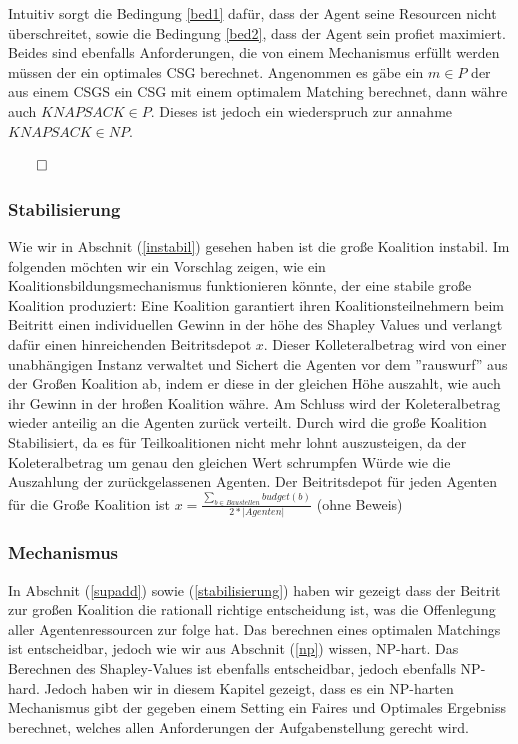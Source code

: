 Intuitiv sorgt die Bedingung \ref{bed1} dafür, dass der Agent seine Resourcen nicht überschreitet, sowie die Bedingung \ref{bed2}, dass der Agent sein profiet maximiert. Beides sind ebenfalls Anforderungen, die von einem Mechanismus erfüllt werden müssen der ein optimales CSG berechnet.
Angenommen es gäbe ein $m\in P$ der aus einem CSGS ein CSG mit einem optimalem Matching berechnet, dann währe auch $KNAPSACK\in P$. Dieses ist jedoch ein wiederspruch zur annahme $KNAPSACK\in NP$.
\begin{flushright}
  $\qed$
\end{flushright}

\subsubsection*{Stabilisierung}
\label{stabilisierung}
Wie wir in Abschnit (\ref{instabil}) gesehen haben ist die große Koalition instabil. Im folgenden möchten wir ein Vorschlag zeigen, wie ein Koalitionsbildungsmechanismus funktionieren könnte, der eine stabile große Koalition produziert:
Eine Koalition garantiert ihren Koalitionsteilnehmern beim Beitritt einen individuellen Gewinn in der höhe des Shapley Values und verlangt dafür einen hinreichenden Beitritsdepot $x$. Dieser Kolleteralbetrag wird von einer unabhängigen Instanz verwaltet und Sichert die Agenten vor dem ''rauswurf'' aus der Großen Koalition ab, indem er diese in der gleichen Höhe auszahlt, wie auch ihr Gewinn in der hroßen Koalition währe. Am Schluss wird der Koleteralbetrag wieder anteilig an die Agenten zurück verteilt. Durch wird die große Koalition Stabilisiert, da es für Teilkoalitionen nicht mehr lohnt auszusteigen, da der Koleteralbetrag um genau den gleichen Wert schrumpfen Würde wie die Auszahlung der zurückgelassenen Agenten. Der Beitritsdepot für jeden Agenten für die Große Koalition ist $x=\frac{\sum_{b\in Baustellen} budget(b)}{2*|Agenten|}$ (ohne Beweis)

\subsubsection{Mechanismus}
\label{thmechanism}
In Abschnit (\ref{supadd}) sowie (\ref{stabilisierung}) haben wir gezeigt dass der Beitrit zur großen Koalition die rationall richtige entscheidung ist, was die Offenlegung aller Agentenressourcen zur folge hat.
Das berechnen eines optimalen Matchings ist entscheidbar, jedoch wie wir aus Abschnit (\ref{np}) wissen, NP-hart.
Das Berechnen des Shapley-Values ist ebenfalls entscheidbar, jedoch ebenfalls NP-hard.
Jedoch haben wir in diesem Kapitel gezeigt, dass es ein NP-harten Mechanismus gibt der gegeben einem Setting ein Faires und Optimales Ergebniss berechnet, welches allen Anforderungen der Aufgabenstellung gerecht wird.
